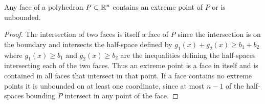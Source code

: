\begin{lemma}\label{face}
Any face of a polyhedron $P\subset \mathbb{R}^n$ contains an extreme point of $P$ or is unbounded.
\begin{proof}
The intersection of two faces is itself a face of $P$ since the intersection is on the boundary and intersects the half-space defined by $g_1(x)+g_2(x)\geq b_1+b_2$ where $g_1(x) \geq b_1$ and $g_2(x) \geq b_2$ are the inequalities defining the half-spaces intersecting each of the two faces. Thus an extreme point is a face in itself and is contained in all faces that intersect in that point. If a face contains no extreme points it is unbounded on at least one coordinate, since at most $n-1$ of the half-spaces bounding $P$ intersect in any point of the face.
\end{proof}
\end{lemma}
